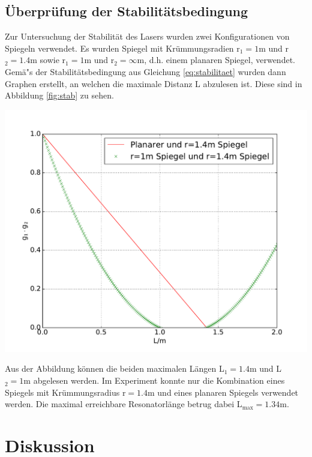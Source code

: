 \documentclass[captions=tableheading]{scrartcl}
\begin{document}
\subsection{Überprüfung der Stabilitätsbedingung}
Zur Untersuchung der Stabilität des Lasers wurden zwei Konfigurationen von Spiegeln verwendet. Es wurden Spiegel mit Krümmungsradien r$_1=1\si{\meter}$ und r$_2=1.4\si{\meter}$ sowie r$_1=1\si{\meter}$ und r$_2=\infty\si{\meter}$, d.h. einem planaren Spiegel, verwendet. \\
Gemä"s der Stabilitätsbedingung aus Gleichung \ref{eq:stabilitaet} wurden dann Graphen erstellt, an welchen die maximale Distanz L abzulesen ist. Diese sind in Abbildung \ref{fig:stab} zu sehen. \\
\begin{center}
	\includegraphics[width=\textwidth]{images/vorbereitung.pdf}
	\label{fig:stab}
\end{center}
Aus der Abbildung können die beiden maximalen Längen L$_1=1.4\si{\meter}$ und L$_2=1\si{\metre}$ abgelesen werden. Im Experiment konnte nur die Kombination eines Spiegels mit Krümmungsradius r$=1.4\si{\metre}$ und eines planaren Spiegels verwendet werden. Die maximal erreichbare Resonatorlänge betrug dabei L$_{\text{max}}=1.34\si{\meter}$.

\section{Diskussion}
\end{document}
